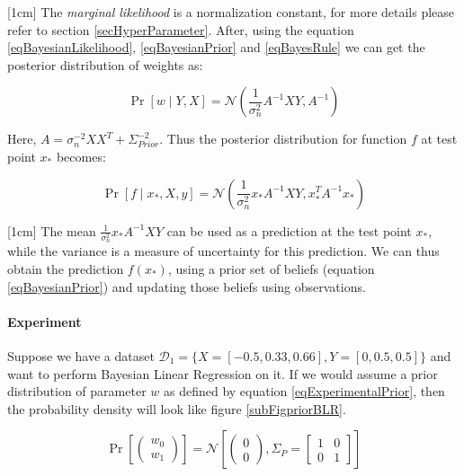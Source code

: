 [1cm]
The \textsl{marginal likelihood} is a normalization constant, for more details please refer to section \ref{secHyperParameter}. After, using the equation \ref{eqBayesianLikelihood}, \ref{eqBayesianPrior} and \ref{eqBayesRule} we can get the posterior distribution of weights as:

\begin{equation}\label{eqBayesianPosterior}
\Pr[w \mid Y, X]  = \mathcal{N}\left ( \frac{1}{\sigma_{n}^{2}} A^{-1}X Y , A^{-1} \right )
\end{equation}

Here, \(A = \sigma_{n}^{-2}XX^{T} + \Sigma_{Prior}^{-2}\). Thus the posterior distribution for function \(f\) at test point \(x_{*}\) becomes:

\begin{equation}\label{eqBayesianFunctionalPosterior}
\Pr[f \mid x_{*}, X, y]  = \mathcal{N}\left ( \frac{1}{\sigma_{n}^{2}} x_{*}A^{-1}XY , x_{*}^{T}A^{-1}x_{*} \right )
\end{equation}

[1cm]
The mean \(\frac{1}{\sigma_{n}^{2}} x_{*}A^{-1}XY\) can be used as a prediction at the test point \(x_{*}\), while the variance is a measure of uncertainty for this prediction. We can thus obtain the prediction \(f(x_{*})\), using a prior set of beliefs (equation \ref{eqBayesianPrior}) and updating those beliefs using observations. 

\paragraph{Experiment}\label{toyDataSet1}
Suppose we have a dataset \(\mathcal{D}_{1} = \{X = [-0.5, 0.33, 0.66], Y = [0, 0.5, 0.5]\}\) and want to perform Bayesian Linear Regression on it. If we would assume a prior distribution of parameter \(w\) as defined by equation \ref{eqExperimentalPrior}, then the probability density will look like figure \ref{subFigpriorBLR}.

\begin{equation}\label{eqExperimentalPrior}
\Pr \left [\begin{pmatrix}
w_{0}\\ 
w_{1}
\end{pmatrix} \right ] = \mathcal{N}\left [ \begin{pmatrix}
0\\ 
0
\end{pmatrix}, \Sigma_{P} = \begin{bmatrix}
1 & 0\\ 
0 & 1
\end{bmatrix} \right ]
\end{equation}

